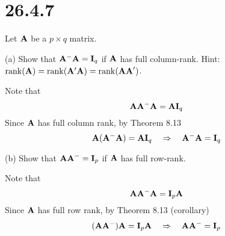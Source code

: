 \section*{26.4.7}
Let $\bf A$ be a $p\times q$ matrix.

\bigskip
\noindent
(a) Show that ${\bf A}^{-{}}{\bf A}={\bf I}_q$ if $\bf A$ has full
column-rank.
Hint: $\mathop{\rm rank}({\bf A})
=\mathop{\rm rank}({\bf A}'{\bf A})
=\mathop{\rm rank}({\bf AA}')$.

\bigskip
\noindent
Note that
$${\bf A}{\bf A}^{-{}}{\bf A}={\bf A}{\bf I}_q$$
Since $\bf A$ has full column rank, by Theorem 8.13
$${\bf A}({\bf A}^{-{}}{\bf A})={\bf A}{\bf I}_q
\quad\Rightarrow\quad
{\bf A}^{-{}}{\bf A}={\bf I}_q
$$

\bigskip
\noindent
(b) Show that ${\bf AA}^{-{}}={\bf I}_p$ if $\bf A$ has full
row-rank.

\bigskip
\noindent
Note that
$${\bf A}{\bf A}^{-{}}{\bf A}={\bf I}_p{\bf A}$$
Since $\bf A$ has full row rank, by Theorem 8.13 (corollary)
$$({\bf A}{\bf A}^{-{}}){\bf A}={\bf I}_p{\bf A}
\quad\Rightarrow\quad
{\bf AA}^{-{}}={\bf I}_p
$$
